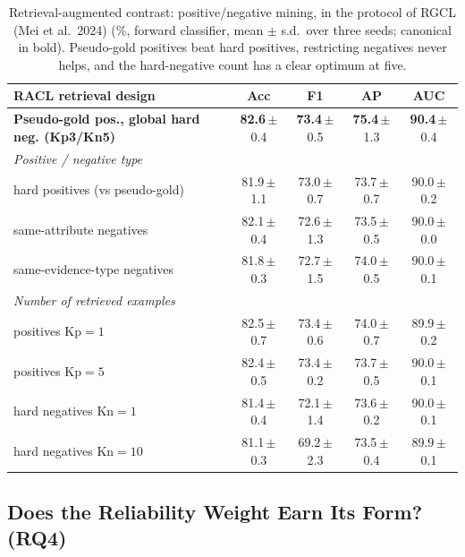 \documentclass[11pt]{article}
\newcommand{\best}[1]{\textbf{#1}}
\begin{document}
\begin{table}[t]
\centering\small
\setlength{\tabcolsep}{6pt}
\newcommand{\pmsd}[1]{\,{\scriptsize$\pm$#1}}
\begin{tabular}{lcccc}
\toprule
\textbf{RACL retrieval design} & \textbf{Acc} & \textbf{F1} & \textbf{AP} & \textbf{AUC} \\
\midrule
\textbf{Pseudo-gold pos., global hard neg. (Kp3/Kn5)} & \best{82.6}\pmsd{0.4} & \best{73.4}\pmsd{0.5} & \best{75.4}\pmsd{1.3} & \best{90.4}\pmsd{0.4} \\
\midrule
\multicolumn{5}{l}{\emph{Positive / negative type}}\\
\quad hard positives (vs pseudo-gold)      & 81.9\pmsd{1.1} & 73.0\pmsd{0.7} & 73.7\pmsd{0.7} & 90.0\pmsd{0.2} \\
\quad same-attribute negatives             & 82.1\pmsd{0.4} & 72.6\pmsd{1.3} & 73.5\pmsd{0.5} & 90.0\pmsd{0.0} \\
\quad same-evidence-type negatives         & 81.8\pmsd{0.3} & 72.7\pmsd{1.5} & 74.0\pmsd{0.5} & 90.0\pmsd{0.1} \\
\midrule
\multicolumn{5}{l}{\emph{Number of retrieved examples}}\\
\quad positives Kp$=1$                     & 82.5\pmsd{0.7} & 73.4\pmsd{0.6} & 74.0\pmsd{0.7} & 89.9\pmsd{0.2} \\
\quad positives Kp$=5$                     & 82.4\pmsd{0.5} & 73.4\pmsd{0.2} & 73.7\pmsd{0.5} & 90.0\pmsd{0.1} \\
\quad hard negatives Kn$=1$                & 81.4\pmsd{0.4} & 72.1\pmsd{1.4} & 73.6\pmsd{0.2} & 90.0\pmsd{0.1} \\
\quad hard negatives Kn$=10$               & 81.1\pmsd{0.3} & 69.2\pmsd{2.3} & 73.5\pmsd{0.4} & 89.9\pmsd{0.1} \\
\bottomrule
\end{tabular}
\caption{Retrieval-augmented contrast: positive/negative mining, in the protocol
of RGCL (Mei et al.\ 2024) (\%, forward classifier, mean $\pm$ s.d.\ over three seeds;
canonical in bold). Pseudo-gold positives beat hard positives, restricting
negatives never helps, and the hard-negative count has a clear optimum at five.}
\label{tab:abl_racl}
\end{table}

\subsection{Does the Reliability Weight Earn Its Form? (RQ4)}
\label{sec:exp:cval}
\end{document}
